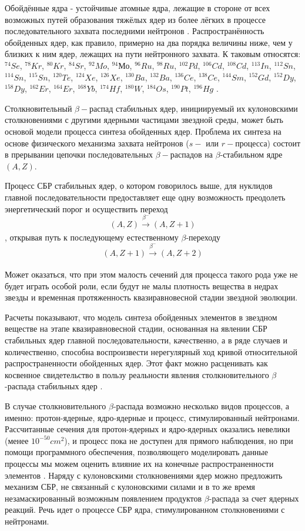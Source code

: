 \documentclass[%
master,    %
natbib,      %
subf,        %
href,        %
colorlinks,  %
]{disser}
\begin{document}
Обойдённые ядра - устойчивые атомные ядра, лежащие в стороне от всех возможных путей образования тяжёлых ядер из более лёгких в процессе последовательного захвата последними нейтронов \cite{reactions}. Распространённость обойденных ядер, как правило, примерно на два порядка величины ниже, чем у близких к ним ядер, лежащих на пути нейтронного захвата. К таковым относятся: $^{74}Se$, $^{78}Kr$, $^{80}Kr$, $^{84}Sr$, $^{92}Mo$, $^{94}Мо$, $^{96}Ru$, $^{98}Ru$, $^{102}Pd$, $^{106}Cd$, $^{108}Cd$, $^{113}In$, $^{112}Sn$, $^{114}Sn$, $^{115}Sn$, $^{120}Te$, $^{124}Xe$, $^{126}Xe$, $^{130}Ba$, $^{132}Ba$, $^{136}Ce$, $^{138}Ce$, $^{144}Sm$, $^{152}Gd$, $^{152}Dy$, $^{158}Dy$, $^{162}Er$, $^{164}Er$, $^{168}Yb$, $^{174}Hf$, $^{180}W$, $^{184}Os$, $^{190}Pt$, $^{196}Hg$ \cite{role}.

Столкновительный $\beta-$распад стабильных ядер, инициируемый их кулоновскими столкновениями с другими ядерными частицами звездной среды, может быть основой модели процесса синтеза обойденных ядер.
Проблема их синтеза на основе физического механизма захвата нейтронов ($s-$ или $r-$процесса) состоит в прерывании цепочки последовательных $\beta-$распадов на $\beta$-стабильном ядре $(A,Z)$.

Процесс СБР стабильных ядер, о котором говорилось выше, для нуклидов главной последовательности предоставляет еще одну возможность преодолеть энергетический порог и осуществить переход 
$$(A,Z) \xrightarrow[]{\beta^-} (A,Z + 1)$$
, открывая путь к последующему естественному $\beta$-переходу
$$(A,Z+1) \xrightarrow[]{\beta^-} (A,Z + 2)$$

Может оказаться, что при этом малость сечений для процесса такого рода уже не будет играть особой роли, если будут не малы плотность вещества в недрах звезды и временная протяженность квазиравновесной стадии звездной эволюции.

Расчеты показывают, что модель синтеза обойденных элементов в звездном веществе на этапе квазиравновесной стадии, основанная на явлении СБР стабильных ядер главной последовательности, качественно, а в ряде случаев и количественно, способна воспроизвести нерегулярный ход кривой относительной распространенности обойденных ядер. Этот факт можно расценивать как косвенное свидетельство в пользу реальности явления столкновительного $\beta$-распада стабильных ядер \cite{tak}.

В случае столкновительного $\beta$-распада возможно несколько видов процессов, а именно: протон-ядерные, ядро-ядерные и процесс, стимулированный нейтронами. Рассчитанные сечения для протон-ядерных и ядро-ядерных оказались невелики (менее $10^{-50}cm^2$), и процесс пока не доступен для прямого наблюдения, но при помощи программного обеспечения, позволяющего моделировать данные процессы мы можем оценить влияние их на конечные распространенности элементов \cite{tak_article}. Наряду с кулоновскими столкновениями ядер можно предложить механизм СБР, не связанный с кулоновскими силами и в то же время незамаскированный возможным появлением продуктов $\beta$-распада за счет ядерных реакций. Речь идет о процессе СБР ядра, стимулированном столкновениями с нейтронами.
\end{document}
